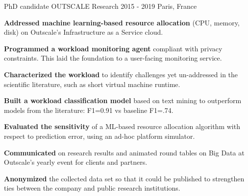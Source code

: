\begin{cventries}
\vspace{1mm}
  \cventry
  {PhD candidate}
  {OUTSCALE Research}
  {2015 - 2019} %
  {Paris, France} %
  {
    \begin{cvitemsspaced} %
    \item {\textbf{Addressed machine learning-based resource allocation} (CPU, memory, disk) on Outscale's Infrastructure as a Service cloud.}
    \item{\textbf{Programmed a workload monitoring agent} compliant with privacy constraints. This laid the foundation to a user-facing monitoring service.}
    \item{\textbf{Characterized the workload} to identify challenges yet un-addressed in the scientific literature, such as short virtual machine runtime.}
    \item{\textbf{Built a workload classification model} based on text mining to outperform models from the literature: F1=0.91 vs baseline F1=.74.}
    \item{\textbf{Evaluated the sensitivity} of a ML-based resource allocation algorithm with respect to prediction error, using an ad-hoc platform simulator.}
    \item{\textbf{Communicated} on research results and animated round tables on Big Data at Outscale's yearly event for clients and partners.}
    \item{\textbf{Anonymized} the collected data set so that it could be published to strengthen ties between the company and public research institutions.}
    \end{cvitemsspaced}
  }





\end{cventries}
